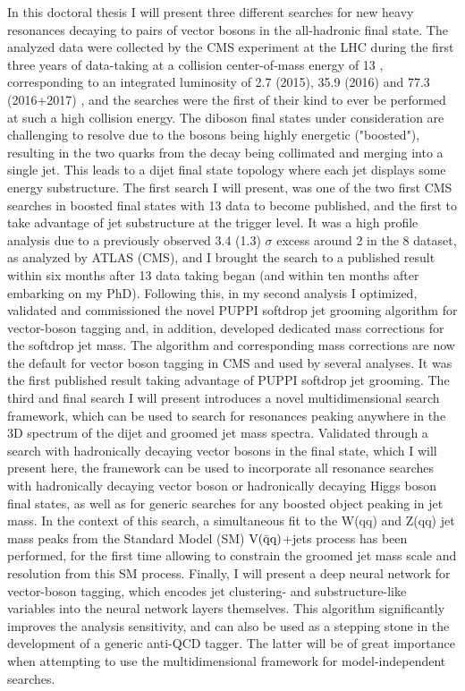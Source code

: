 \small
\noindent In this doctoral thesis I will present three different searches for new heavy resonances decaying to pairs of vector bosons in the all-hadronic final state. The analyzed data were collected by the CMS experiment at the LHC during the first three years of data-taking at a collision center-of-mass energy of 13 \TeV, corresponding to an integrated luminosity of 2.7 (2015), 35.9 (2016) and 77.3 (2016+2017) \fbinv, and the searches were the first of their kind to ever be performed at such a high collision energy. The diboson final states under consideration are challenging to resolve due to the bosons being highly energetic ("boosted"), resulting in the two quarks from the decay being collimated and merging into a single jet. This leads to a dijet final state topology where each jet displays some energy substructure. The first search I will present, was one of the two first CMS searches in boosted final states with 13 \TeV data to become published, and the first to take advantage of jet substructure at the trigger level. It was a high profile analysis due to a previously observed 3.4 (1.3) $\sigma$ excess around 2 \TeV in the 8 \TeV dataset, as analyzed by ATLAS (CMS), and I brought the search to a published result within six months after 13 \TeV data taking began (and within ten months after embarking on my PhD). Following this, in my second analysis I optimized, validated and commissioned the novel PUPPI softdrop jet grooming algorithm for vector-boson tagging and, in addition, developed dedicated mass corrections for the softdrop jet mass. The algorithm and corresponding mass corrections are now the default for vector boson tagging in CMS and used by several analyses. It was the first published result taking advantage of PUPPI softdrop jet grooming. The third and final search I will present introduces a novel multidimensional search framework, which can be used to search for resonances peaking anywhere in the 3D spectrum of the dijet and groomed jet mass spectra. Validated through a search with hadronically decaying vector bosons in the final state, which I will present here, the framework can be used to incorporate all resonance searches with hadronically decaying vector boson or hadronically decaying Higgs boson final states, as well as for generic searches for any boosted object peaking in jet mass. In the context of this search, a simultaneous fit to the W(qq) and Z(qq) jet mass peaks from the Standard Model (SM) $\mathrm{V}(\bar{\rm{q}}\rm{q})$+jets process has been performed, for the first time allowing to constrain the groomed jet mass scale and resolution from this SM process. Finally, I will present a deep neural network for vector-boson tagging, which encodes jet clustering- and substructure-like variables into the neural network layers themselves. This algorithm significantly improves the analysis sensitivity, and can also be used as a stepping stone in the development of a generic anti-QCD tagger. The latter will be of great importance when attempting to use the multidimensional framework for model-independent searches.